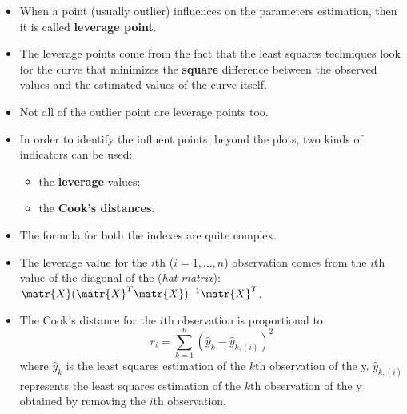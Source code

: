 \begin{frame}
\vspace{0.5cm}
  \begin{itemize}
    \item When a point (usually outlier) influences on the parameters estimation, then it is called \textbf{leverage point}.
    \vspace{0.5cm}
    \item The leverage points come from the fact that the least squares techniques look for the curve that minimizes the \textbf{square} difference between the observed values and the estimated values of the curve itself.
    \vspace{0.5cm}
    \item Not all of the outlier point are leverage points too.
  \end{itemize}
\end{frame}

\begin{frame}
  \begin{itemize}
    \item In order to identify the influent points, beyond the plots, two kinds of indicators can be used:
    \begin{itemize}
      \item the \textbf{leverage} values;
      \item the \textbf{Cook's distances}.
    \end{itemize}
    \vspace{0.75cm}
    \item The formula for both the indexes are quite complex. 
  \end{itemize}
\end{frame}

\begin{frame}
  \begin{itemize}
    \item The leverage value for the $i$th ($i=1, \dots, n$) observation comes from the $i$th value of the diagonal of the (\textit{hat matrix}): $\matr{X}(\matr{X}^T\matr{X})^{-1}\matr{X}^T$.
    \vspace{0.5cm}
    \item The Cook's distance for the $i$th observation is proportional to 
      $$ r_i = \sum_{k=1}^n (\hat{y}_k - \hat{y}_{k,(i)})^2 $$
      where $ \hat{y}_k $ is the least squares estimation of the $ k $th observation of the y. $ \hat{y}_{k,(i)}$ represents the least squares estimation of the $ k $th observation of the y obtained by removing the $ i $th observation.
  \end{itemize}
\end{frame}

